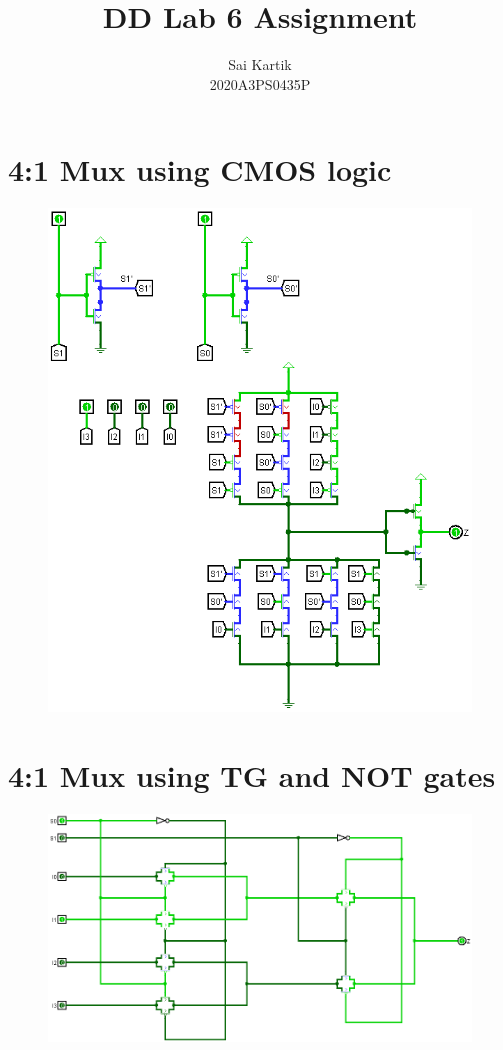 \documentclass[12pt]{article}
\title{DD Lab 6 Assignment}
\author{Sai Kartik \\2020A3PS0435P}
\begin{document}
\maketitle
    \section{4:1 Mux using CMOS logic}
    \begin{center}
        \begin{figure}[ht]
            \includegraphics[scale=0.40]{cmos.png}
        \end{figure}
    \end{center}
    \section{4:1 Mux using TG and NOT gates}
    \begin{center}
        \begin{figure}[ht]
            \includegraphics[scale=0.50]{tg.png}
        \end{figure}
    \end{center}
\end{document}

